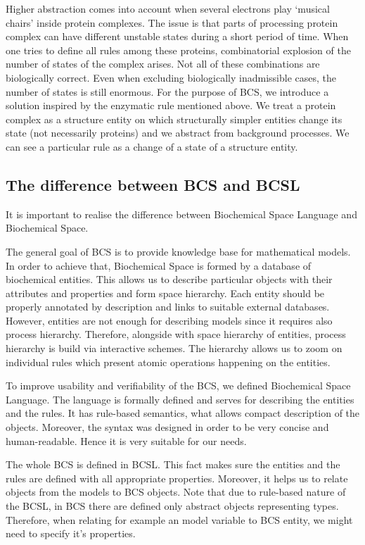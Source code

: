 \documentclass[12pt]{fithesis2}
\begin{document}
Higher abstraction comes into account when several electrons play `musical chairs' inside protein complexes. The issue is that parts of processing protein complex can have different unstable states during a short period of time. When one tries to define all rules among these proteins, combinatorial explosion of the number of states of the complex arises. Not all of these combinations are biologically correct. Even when excluding biologically inadmissible cases, the number of states is still enormous. For the purpose of BCS, we introduce a solution inspired by the enzymatic rule mentioned above. We treat a protein complex as a structure entity on which structurally simpler entities change its state (not necessarily proteins) and we abstract from background processes. We can see a particular rule as a change of a state of a structure entity.

\subsection{The difference between BCS and BCSL}

It is important to realise the difference between Biochemical Space Language and Biochemical Space. 

The general goal of BCS is to provide knowledge base for mathematical models. In order to achieve that, Biochemical Space is formed by a database of biochemical entities. This allows us to describe particular objects with their attributes and properties and form space hierarchy. Each entity should be properly annotated by description and links to suitable external databases. However, entities are not enough for describing models since it requires also process hierarchy. Therefore, alongside with space hierarchy of entities, process hierarchy is build via interactive schemes. The hierarchy allows us to zoom on individual rules which present atomic operations happening on the entities.

To improve usability and verifiability of the BCS, we defined Biochemical Space Language. The language is formally defined and serves for describing the entities and the rules. It has rule-based semantics, what allows compact description of the objects. Moreover, the syntax was designed in order to be very concise and human-readable. Hence it is very suitable for our needs.

The whole BCS is defined in BCSL. This fact makes sure the entities and the rules are defined with all appropriate properties. Moreover, it helps us to relate objects from the models to BCS objects. Note that due to rule-based nature of the BCSL, in BCS there are defined only abstract objects representing types. Therefore, when relating for example an model variable to BCS entity, we might need to specify it's properties. 
\end{document}
